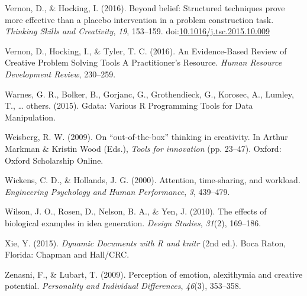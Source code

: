 \documentclass[english,man]{apa6}
\begin{document}
\leavevmode\hypertarget{ref-vernon_beyond_2016}{}%
Vernon, D., \& Hocking, I. (2016). Beyond belief: Structured techniques
prove more effective than a placebo intervention in a problem
construction task. \emph{Thinking Skills and Creativity}, \emph{19},
153--159.
doi:\href{https://doi.org/10.1016/j.tsc.2015.10.009}{10.1016/j.tsc.2015.10.009}

\leavevmode\hypertarget{ref-vernon_evidence-based_2016}{}%
Vernon, D., Hocking, I., \& Tyler, T. C. (2016). An Evidence-Based
Review of Creative Problem Solving Tools A Practitioner's Resource.
\emph{Human Resource Development Review}, 230--259.

\leavevmode\hypertarget{ref-WarnesgdataVariousProgramming2015}{}%
Warnes, G. R., Bolker, B., Gorjanc, G., Grothendieck, G., Korosec, A.,
Lumley, T., \ldots{} others. (2015). Gdata: Various R Programming Tools
for Data Manipulation.

\leavevmode\hypertarget{ref-weisberg2009out}{}%
Weisberg, R. W. (2009). On ``out-of-the-box'' thinking in creativity. In
Arthur Markman \& Kristin Wood (Eds.), \emph{Tools for innovation} (pp.
23--47). Oxford: Oxford Scholarship Online.

\leavevmode\hypertarget{ref-wickens2000attention}{}%
Wickens, C. D., \& Hollands, J. G. (2000). Attention, time-sharing, and
workload. \emph{Engineering Psychology and Human Performance}, \emph{3},
439--479.

\leavevmode\hypertarget{ref-wilson2010effects}{}%
Wilson, J. O., Rosen, D., Nelson, B. A., \& Yen, J. (2010). The effects
of biological examples in idea generation. \emph{Design Studies},
\emph{31}(2), 169--186.

\leavevmode\hypertarget{ref-R-knitr}{}%
Xie, Y. (2015). \emph{Dynamic Documents with R and knitr} (2nd ed.).
Boca Raton, Florida: Chapman and Hall/CRC.

\leavevmode\hypertarget{ref-zenasni2009perception}{}%
Zenasni, F., \& Lubart, T. (2009). Perception of emotion, alexithymia
and creative potential. \emph{Personality and Individual Differences},
\emph{46}(3), 353--358.


\clearpage
\renewcommand{\listtablename}{Table captions}
\listoftables
\end{document}
